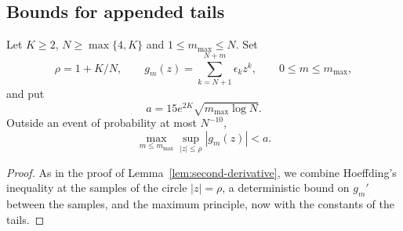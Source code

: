 

\subsection{Bounds for appended tails}
\begin{lemma}\label{lem:tails}
Let $K\ge2$, $N\ge\max\{4,K\}$ and $1\le m_{\max}\le N$. Set
\[
 \rho=1+K/N,\qquad g_m(z)=\sum_{k=N+1}^{N+m}\epsilon_kz^k,
 \qquad 0\le m\le m_{\max},
\]
and put
\[
 a=15e^{2K}\sqrt{m_{\max}\log N}.
\]
Outside an event of probability at most $N^{-10}$,
\[
 \max_{m\le m_{\max}}\sup_{|z|\le\rho}|g_m(z)|<a.
\]
\end{lemma}

\begin{proof}
As in the proof of Lemma~\ref{lem:second-derivative}, we combine
Hoeffding's inequality at the samples of the circle $|z|=\rho$, a
deterministic bound on $g_m'$ between the samples, and the maximum
principle, now with the constants of the tails.


\end{proof}

